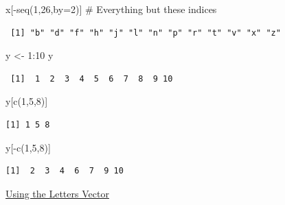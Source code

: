 \documentclass[
  letterpaper,
  DIV=11,
  numbers=noendperiod]{scrreprt}
\newenvironment{Shaded}{\begin{snugshade}}{\end{snugshade}}
\newcommand{\AttributeTok}[1]{\textcolor[rgb]{0.40,0.45,0.13}{#1}}
\newcommand{\CommentTok}[1]{\textcolor[rgb]{0.37,0.37,0.37}{#1}}
\newcommand{\DecValTok}[1]{\textcolor[rgb]{0.68,0.00,0.00}{#1}}
\newcommand{\FunctionTok}[1]{\textcolor[rgb]{0.28,0.35,0.67}{#1}}
\newcommand{\NormalTok}[1]{\textcolor[rgb]{0.00,0.23,0.31}{#1}}
\newcommand{\OtherTok}[1]{\textcolor[rgb]{0.00,0.23,0.31}{#1}}
\newcommand{\SpecialCharTok}[1]{\textcolor[rgb]{0.37,0.37,0.37}{#1}}
\begin{document}
\begin{Shaded}
\begin{Highlighting}[]
\NormalTok{x[}\SpecialCharTok{{-}}\FunctionTok{seq}\NormalTok{(}\DecValTok{1}\NormalTok{,}\DecValTok{26}\NormalTok{,}\AttributeTok{by=}\DecValTok{2}\NormalTok{)] }\CommentTok{\# Everything but these indices}
\end{Highlighting}
\end{Shaded}

\begin{verbatim}
 [1] "b" "d" "f" "h" "j" "l" "n" "p" "r" "t" "v" "x" "z"
\end{verbatim}

\begin{Shaded}
\begin{Highlighting}[]
\NormalTok{y }\OtherTok{\textless{}{-}} \DecValTok{1}\SpecialCharTok{:}\DecValTok{10}
\NormalTok{y}
\end{Highlighting}
\end{Shaded}

\begin{verbatim}
 [1]  1  2  3  4  5  6  7  8  9 10
\end{verbatim}

\begin{Shaded}
\begin{Highlighting}[]
\NormalTok{y[}\FunctionTok{c}\NormalTok{(}\DecValTok{1}\NormalTok{,}\DecValTok{5}\NormalTok{,}\DecValTok{8}\NormalTok{)]}
\end{Highlighting}
\end{Shaded}

\begin{verbatim}
[1] 1 5 8
\end{verbatim}

\begin{Shaded}
\begin{Highlighting}[]
\NormalTok{y[}\SpecialCharTok{{-}}\FunctionTok{c}\NormalTok{(}\DecValTok{1}\NormalTok{,}\DecValTok{5}\NormalTok{,}\DecValTok{8}\NormalTok{)]}
\end{Highlighting}
\end{Shaded}

\begin{verbatim}
[1]  2  3  4  6  7  9 10
\end{verbatim}

\begin{watch}{}{}
    \href{https://youtu.be/H-q_LZVM0_0}{Using the Letters Vector}
\end{watch}
\end{document}

